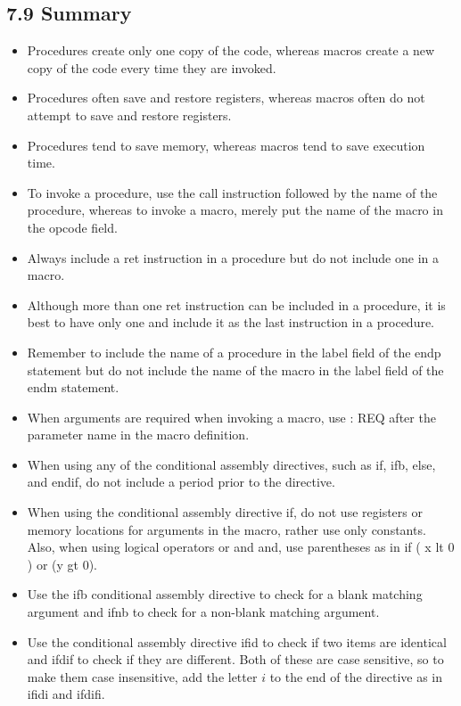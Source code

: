 \documentclass[10pt]{article}
\begin{document}
\subsection*{7.9 Summary}
\begin{itemize}
  \item Procedures create only one copy of the code, whereas macros create a new copy of the code every time they are invoked.
  \item Procedures often save and restore registers, whereas macros often do not attempt to save and restore registers.
  \item Procedures tend to save memory, whereas macros tend to save execution time.
  \item To invoke a procedure, use the call instruction followed by the name of the procedure, whereas to invoke a macro, merely put the name of the macro in the opcode field.
  \item Always include a ret instruction in a procedure but do not include one in a macro.
  \item Although more than one ret instruction can be included in a procedure, it is best to have only one and include it as the last instruction in a procedure.
  \item Remember to include the name of a procedure in the label field of the endp statement but do not include the name of the macro in the label field of the endm statement.
  \item When arguments are required when invoking a macro, use : REQ after the parameter name in the macro definition.
  \item When using any of the conditional assembly directives, such as if, ifb, else, and endif, do not include a period prior to the directive.
  \item When using the conditional assembly directive if, do not use registers or memory locations for arguments in the macro, rather use only constants. Also, when using logical operators or and and, use parentheses as in if ( x lt 0 ) or (y gt 0).
  \item Use the ifb conditional assembly directive to check for a blank matching argument and ifnb to check for a non-blank matching argument.
  \item Use the conditional assembly directive ifid to check if two items are identical and ifdif to check if they are different. Both of these are case sensitive, so to make them case insensitive, add the letter $i$ to the end of the directive as in ifidi and ifdifi.
\end{itemize}
\end{document}
